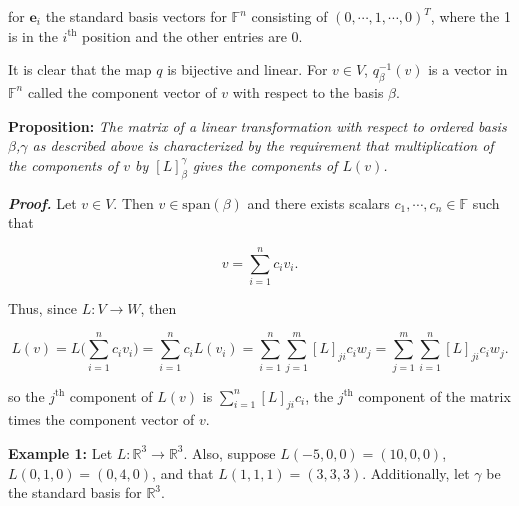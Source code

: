 \documentclass[12pt, a4paper]{article}
\begin{document}
 \vspace{2mm}
 
 \noindent for $\mathbf{e}_i$ the standard basis vectors for $\mathbb{F}^n$ consisting of $(0, \cdots, 1, \cdots, 0)^T$, where the 1 is in the $i^{\text{th}}$ position and the other entries are 0.\par
 It is clear that the map $q$ is bijective and linear. For $v\in V$, $q^{-1}_{\beta}(v)$ is a vector in $\mathbb{F}^n$ called the component vector of $v$ with respect to the basis $\beta$.
 
 \newpage
 
 \noindent\textbf{Proposition:} \textit{The matrix of a linear transformation with respect to ordered basis $\beta$,$\gamma$ as described above is characterized by the requirement that multiplication of the components of $v$ by $[L]_{\beta}^{\gamma}$ gives the components of $L(v)$.}
 
 \vspace{2mm}
 
 \textbf{\textit{Proof.}} Let $v\in V$. Then $v\in\text{span}(\beta)$ and there exists scalars $c_1,\cdots,c_n\in\mathbb{F}$ such that 
 
 \begin{equation*}
     v=\sum\limits_{i=1}^nc_iv_i.
 \end{equation*}
 
 \vspace{2mm}
 
 \noindent Thus, since $L\colon V\rightarrow W$, then
 
 \begin{equation*}
     L(v)=L\bigg(\sum\limits_{i=1}^nc_iv_i\bigg)=\sum\limits_{i=1}^nc_iL(v_i)=\sum\limits_{i=1}^n\sum\limits_{j=1}^m[L]_{ji}c_iw_j=\sum\limits_{j=1}^m\sum\limits_{i=1}^n[L]_{ji}c_iw_j.
 \end{equation*}
 
 \vspace{2mm}
 
 \noindent so the $j^{\text{th}}$ component of $L(v)$ is $\sum_{i=1}^n[L]_{ji}c_i$, the $j^{\text{th}}$ component of the matrix times the component vector of $v$.
 
 \vspace{2mm}
 
 \noindent\textbf{Example 1:} Let $L\colon\mathbb{R}^3\rightarrow\mathbb{R}^3$. Also, suppose $L(-5,0,0)=(10,0,0)$, $L(0,1,0)=(0,4,0)$, and that $L(1,1,1)=(3,3,3)$. Additionally, let $\gamma$ be the standard basis for $\mathbb{R}^3$.
 
\end{document}
